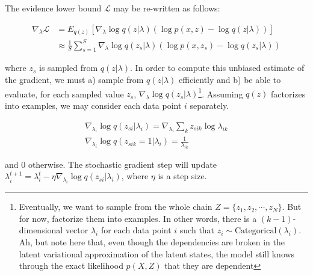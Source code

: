 \documentclass{article}
\begin{document}
The evidence lower bound $\mathcal{L}$ may be re-written as follows:

\begin{align*}
\nabla_\lambda \mathcal{L} &= E_{q(z)} [\nabla_\lambda \log{q(z|\lambda)}(\log{p(x,z) - \log{q(z|\lambda)}})] \\
&\approx \frac{1}{S} \sum^S_{s=1} \nabla_\lambda \log{q(z_s|\lambda)}(\log{p(x,z_s) - \log{q(z_s|\lambda)}})
\end{align*}

where $z_s$ is sampled from $q(z|\lambda)$. In order to compute this unbiased estimate of the gradient, we must a) sample from $q(z|\lambda)$ efficiently and b) be able to evaluate, for each sampled value $z_s$, $\nabla_\lambda \log{q(z_s|\lambda)}$\footnote{Eventually, we want to sample from the whole chain $Z = \{ z_1, z_2, \cdots, z_N \}$. But for now, factorize them into examples. In other words, there is a $(k-1)$-dimensional vector $\lambda_i$ for each data point $i$ such that $z_i \sim \mathrm{Categorical}(\lambda_i)$. Ah, but note here that, even though the dependencies are broken in the latent variational approximation of the latent states, the model still knows through the exact likelihood $p(X, Z)$ that they are dependent}. Assuming $q(z)$ factorizes into examples, we may consider each data point $i$ separately.

\begin{align*}
\nabla_{\lambda_i} \log{q(z_{si}|\lambda_i)} = \nabla_{\lambda_i} \sum_k z_{sik} \log{\lambda_{ik}} \\
\nabla_{\lambda_i} \log{q(z_{sik} = 1|\lambda_i)} = \frac{1}{\lambda_{ik}}
\end{align*}

and 0 otherwise. The stochastic gradient step will update $\lambda_i^{t+1} = \lambda_i^{t} - \eta \nabla_{\lambda_i} \log{q(z_{si}|\lambda_i)}$, where $\eta$ is a step size.

\end{document}

